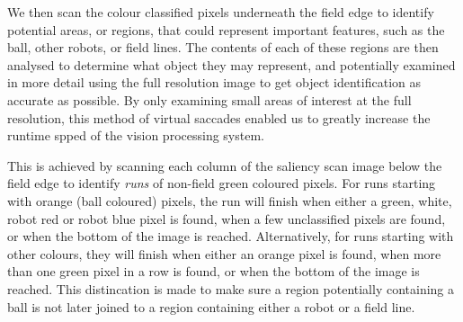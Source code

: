 \documentclass[runningheads,a4paper]{llncs}
\begin{document}
We then scan the colour classified pixels underneath the field edge to identify potential areas, or regions, that could represent important features, such as the ball, other robots, or field lines. The contents of each of these regions are then analysed to determine what object they may represent, and potentially examined in more detail using the full resolution image to get object identification as accurate as possible. By only examining small areas of interest at the full resolution, this method of virtual saccades enabled us to greatly increase the runtime spped of the vision processing system.

This is achieved by scanning each column of the saliency scan image below the field edge to identify \emph{runs} of non-field green coloured pixels. For runs starting with orange (ball coloured) pixels, the run will finish when either a green, white, robot red or robot blue pixel is found, when a few unclassified pixels are found, or when the bottom of the image is reached. Alternatively, for runs starting with other colours, they will finish when either an orange pixel is found, when more than one green pixel in a row is found, or when the bottom of the image is reached. This distincation is made to make sure a region potentially containing a ball is not later joined to a region containing either a robot or a field line.
\end{document}
